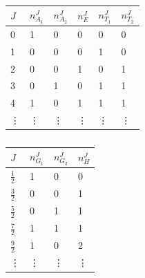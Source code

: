     \renewcommand{\arraystretch}{1.2}
    \begin{table}
        \centering
        \begin{minipage}{.4\linewidth}
        \centering
        \begin{tabular}{l|l|l|l|l|l}
            $J$ & $n_{A_1}^J$ & $n_{A_2}^J$ & $n_{E}^J$ & $n_{T_1}^J$ & $n_{T_2}^J$\\
            \hline
            0 & 1 & 0 & 0 & 0 & 0\\
            1&0&0&0&1&0\\
            2&0&0&1&0&1\\
            3&0&1&0&1&1\\
            4&1&0&1&1&1\\
            \vdots & \vdots & \vdots & \vdots & \vdots & \vdots
        \end{tabular}
        \caption{}
        \label{table:O_occurrence_nums}
        \end{minipage}
        \begin{minipage}{.4\linewidth}
        \centering
        \begin{tabular}{l|l|l|l}
            $J$ & $n_{G_1}^J$ & $n_{G_2}^J$ & $n_{H}^J$ \\
            \hline
            $\frac{1}{2}$&1&0&0\\
            $\frac{3}{2}$&0&0&1\\
            $\frac{5}{2}$&0&1&1\\
            $\frac{7}{2}$&1&1&1\\
            $\frac{9}{2}$&1&0&2\\
            \vdots&\vdots&\vdots&\vdots
        \end{tabular}
        \caption{}
        \label{table:OD_occurrence_nums}
        \end{minipage}
    \end{table}
    \renewcommand{\arraystretch}{1.0}
